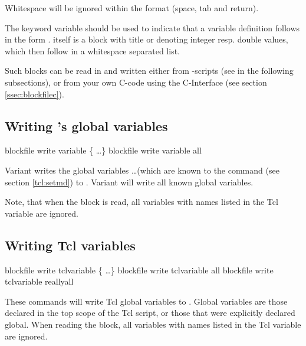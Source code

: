 Whitespace will be ignored within the format (space, tab and return).

The keyword variable should be used to indicate that a variable
definition follows in the form  . 
itself is a block with title  or  denoting
integer resp. double values, which then follow in a whitespace
separated list.  

Such blocks can be read in and written either from \es-scripts (see in
the following subsections), or from your own C-code using the
C-Interface (see section \ref{ssec:blockfilec}).

\subsection{Writing \es's global variables}

\begin{essyntax}
   blockfile  
  write variable \{  \dots \}
   blockfile  write variable all
\end{essyntax}

Variant  writes the global variables 
 \dots (which are known to the  command (see
section \vref{tcl:setmd}) to . Variant  will
write all known global variables.

Note, that when the block is read, all variables with names listed in
the Tcl variable  are ignored.

\subsection{Writing Tcl variables}

\begin{essyntax}
   blockfile  write tclvariable \{
    \dots \}
   blockfile  write tclvariable all
   blockfile  write tclvariable reallyall
\end{essyntax}

These commands will write Tcl global variables to .
Global variables are those declared in the top scope of the Tcl
script, or those that were explicitly declared global.  When reading
the block, all variables with names listed in the Tcl variable
 are ignored.

